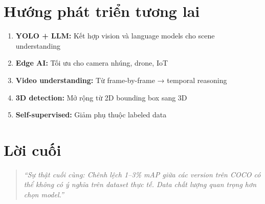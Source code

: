 \section{Hướng phát triển tương lai}

\begin{enumerate}
    \item \textbf{YOLO + LLM:} Kết hợp vision và language models cho scene understanding
    \item \textbf{Edge AI:} Tối ưu cho camera nhúng, drone, IoT
    \item \textbf{Video understanding:} Từ frame-by-frame → temporal reasoning
    \item \textbf{3D detection:} Mở rộng từ 2D bounding box sang 3D
    \item \textbf{Self-supervised:} Giảm phụ thuộc labeled data
\end{enumerate}

\section*{Lời cuối}

\begin{quote}
\textit{``Sự thật cuối cùng: Chênh lệch 1--3\% mAP giữa các version trên COCO có thể không có ý nghĩa trên dataset thực tế. Data chất lượng quan trọng hơn chọn model.''}
\end{quote}

\vspace{1cm}

